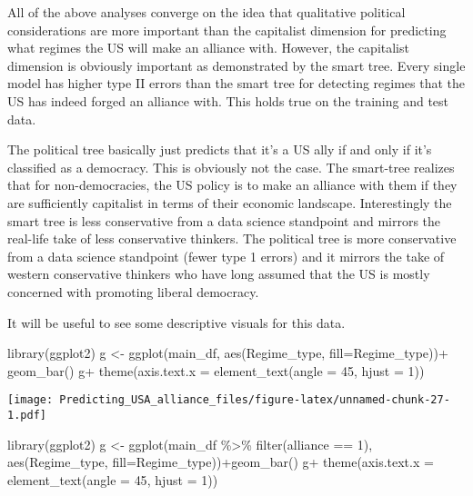 \documentclass[
]{article}
\newenvironment{Shaded}{\begin{snugshade}}{\end{snugshade}}
\newcommand{\AttributeTok}[1]{\textcolor[rgb]{0.77,0.63,0.00}{#1}}
\newcommand{\DecValTok}[1]{\textcolor[rgb]{0.00,0.00,0.81}{#1}}
\newcommand{\FunctionTok}[1]{\textcolor[rgb]{0.00,0.00,0.00}{#1}}
\newcommand{\NormalTok}[1]{#1}
\newcommand{\OtherTok}[1]{\textcolor[rgb]{0.56,0.35,0.01}{#1}}
\newcommand{\SpecialCharTok}[1]{\textcolor[rgb]{0.00,0.00,0.00}{#1}}
\begin{document}
All of the above analyses converge on the idea that qualitative
political considerations are more important than the capitalist
dimension for predicting what regimes the US will make an alliance with.
However, the capitalist dimension is obviously important as demonstrated
by the smart tree. Every single model has higher type II errors than the
smart tree for detecting regimes that the US has indeed forged an
alliance with. This holds true on the training and test data.

The political tree basically just predicts that it's a US ally if and
only if it's classified as a democracy. This is obviously not the case.
The smart-tree realizes that for non-democracies, the US policy is to
make an alliance with them if they are sufficiently capitalist in terms
of their economic landscape. Interestingly the smart tree is less
conservative from a data science standpoint and mirrors the real-life
take of less conservative thinkers. The political tree is more
conservative from a data science standpoint (fewer type 1 errors) and it
mirrors the take of western conservative thinkers who have long assumed
that the US is mostly concerned with promoting liberal democracy.

It will be useful to see some descriptive visuals for this data.

\begin{Shaded}
\begin{Highlighting}[]
\FunctionTok{library}\NormalTok{(ggplot2)}
\NormalTok{g }\OtherTok{\textless{}{-}} \FunctionTok{ggplot}\NormalTok{(main\_df, }\FunctionTok{aes}\NormalTok{(Regime\_type, }\AttributeTok{fill=}\NormalTok{Regime\_type))}\SpecialCharTok{+} \FunctionTok{geom\_bar}\NormalTok{() }
\NormalTok{g}\SpecialCharTok{+} \FunctionTok{theme}\NormalTok{(}\AttributeTok{axis.text.x =} \FunctionTok{element\_text}\NormalTok{(}\AttributeTok{angle =} \DecValTok{45}\NormalTok{, }\AttributeTok{hjust =} \DecValTok{1}\NormalTok{))}
\end{Highlighting}
\end{Shaded}

\texttt{[image: Predicting\_USA\_alliance\_files/figure-latex/unnamed-chunk-27-1.pdf]}

\begin{Shaded}
\begin{Highlighting}[]
\FunctionTok{library}\NormalTok{(ggplot2)}
\NormalTok{g }\OtherTok{\textless{}{-}} \FunctionTok{ggplot}\NormalTok{(main\_df }\SpecialCharTok{\%\textgreater{}\%} \FunctionTok{filter}\NormalTok{(alliance }\SpecialCharTok{==} \DecValTok{1}\NormalTok{), }\FunctionTok{aes}\NormalTok{(Regime\_type, }\AttributeTok{fill=}\NormalTok{Regime\_type))}\SpecialCharTok{+}\FunctionTok{geom\_bar}\NormalTok{() }
\NormalTok{g}\SpecialCharTok{+} \FunctionTok{theme}\NormalTok{(}\AttributeTok{axis.text.x =} \FunctionTok{element\_text}\NormalTok{(}\AttributeTok{angle =} \DecValTok{45}\NormalTok{, }\AttributeTok{hjust =} \DecValTok{1}\NormalTok{))}
\end{Highlighting}
\end{Shaded}
\end{document}
